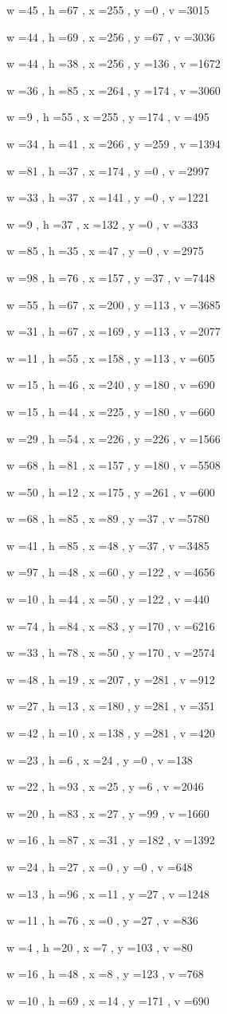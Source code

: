 \documentclass[11pt]{article}
\begin{document}
w =45 , h =67 , x =255 , y =0 , v =3015
\par
w =44 , h =69 , x =256 , y =67 , v =3036
\par
w =44 , h =38 , x =256 , y =136 , v =1672
\par
w =36 , h =85 , x =264 , y =174 , v =3060
\par
w =9 , h =55 , x =255 , y =174 , v =495
\par
w =34 , h =41 , x =266 , y =259 , v =1394
\par
w =81 , h =37 , x =174 , y =0 , v =2997
\par
w =33 , h =37 , x =141 , y =0 , v =1221
\par
w =9 , h =37 , x =132 , y =0 , v =333
\par
w =85 , h =35 , x =47 , y =0 , v =2975
\par
w =98 , h =76 , x =157 , y =37 , v =7448
\par
w =55 , h =67 , x =200 , y =113 , v =3685
\par
w =31 , h =67 , x =169 , y =113 , v =2077
\par
w =11 , h =55 , x =158 , y =113 , v =605
\par
w =15 , h =46 , x =240 , y =180 , v =690
\par
w =15 , h =44 , x =225 , y =180 , v =660
\par
w =29 , h =54 , x =226 , y =226 , v =1566
\par
w =68 , h =81 , x =157 , y =180 , v =5508
\par
w =50 , h =12 , x =175 , y =261 , v =600
\par
w =68 , h =85 , x =89 , y =37 , v =5780
\par
w =41 , h =85 , x =48 , y =37 , v =3485
\par
w =97 , h =48 , x =60 , y =122 , v =4656
\par
w =10 , h =44 , x =50 , y =122 , v =440
\par
w =74 , h =84 , x =83 , y =170 , v =6216
\par
w =33 , h =78 , x =50 , y =170 , v =2574
\par
w =48 , h =19 , x =207 , y =281 , v =912
\par
w =27 , h =13 , x =180 , y =281 , v =351
\par
w =42 , h =10 , x =138 , y =281 , v =420
\par
w =23 , h =6 , x =24 , y =0 , v =138
\par
w =22 , h =93 , x =25 , y =6 , v =2046
\par
w =20 , h =83 , x =27 , y =99 , v =1660
\par
w =16 , h =87 , x =31 , y =182 , v =1392
\par
w =24 , h =27 , x =0 , y =0 , v =648
\par
w =13 , h =96 , x =11 , y =27 , v =1248
\par
w =11 , h =76 , x =0 , y =27 , v =836
\par
w =4 , h =20 , x =7 , y =103 , v =80
\par
w =16 , h =48 , x =8 , y =123 , v =768
\par
w =10 , h =69 , x =14 , y =171 , v =690
\par
\newpage
\end{document}
